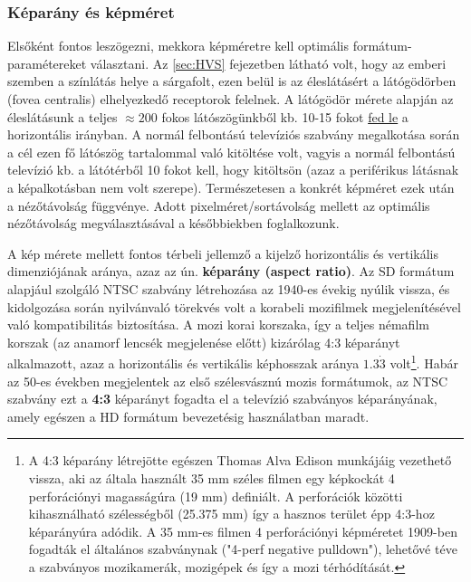 \subsubsection*{Képarány és képméret}
Elsőként fontos leszögezni, mekkora képméretre kell optimális formátum-paramétereket választani.
Az \ref{sec:HVS} fejezetben látható volt, hogy az emberi szemben a színlátás helye a sárgafolt, ezen belül is az éleslátásért a látógödörben (fovea centralis) elhelyezkedő receptorok felelnek.
A látógödör mérete alapján az éleslátásunk a teljes $\approx200$ fokos látószögünkből kb. 10-15 fokot \href{http://hyperphysics.phy-astr.gsu.edu/hbase/vision/retina.html}{fed le} a horizontális irányban.
A normál felbontású televíziós szabvány megalkotása során a cél ezen fő látószög tartalommal való kitöltése volt, vagyis a normál felbontású televízió kb. a látótérből 10 fokot kell, hogy kitöltsön (azaz a periférikus látásnak a képalkotásban nem volt szerepe).
Természetesen a konkrét képméret ezek után a nézőtávolság függvénye.
Adott pixelméret/sortávolság mellett az optimális nézőtávolság megválasztásával a későbbiekben foglalkozunk.

A kép mérete mellett fontos térbeli jellemző a kijelző horizontális és vertikális dimenziójának aránya, azaz az ún. \textbf{képarány (aspect ratio)}.
Az SD formátum alapjául szolgáló NTSC szabvány létrehozása az 1940-es évekig nyúlik vissza, és kidolgozása során nyilvánvaló törekvés volt a korabeli mozifilmek megjelenítésével való kompatibilitás biztosítása.
A mozi korai korszaka, így a teljes némafilm korszak (az anamorf lencsék megjelenése előtt) kizárólag 4:3 képarányt alkalmazott, azaz a horizontális és vertikális képhosszak aránya $1.3\dot{3}$ volt\footnote{A 4:3 képarány létrejötte egészen Thomas Alva Edison munkájáig vezethető vissza, aki az általa használt 35 mm széles filmen egy képkockát 4 perforációnyi magasságúra (19 mm) definiált. 
A perforációk közötti kihasználható szélességből (25.375 mm) így a hasznos terület épp 4:3-hoz képarányúra adódik. 
A 35 mm-es filmen 4 perforációnyi képméretet 1909-ben fogadták el általános szabványnak ("4-perf negative pulldown"), lehetővé téve a szabványos mozikamerák, mozigépek és így a mozi térhódítását.}.
Habár az 50-es években megjelentek az első szélesvásznú mozis formátumok, az NTSC szabvány ezt a \textbf{4:3} képarányt fogadta el a televízió szabványos képarányának, amely egészen a HD formátum bevezetésig használatban maradt.

